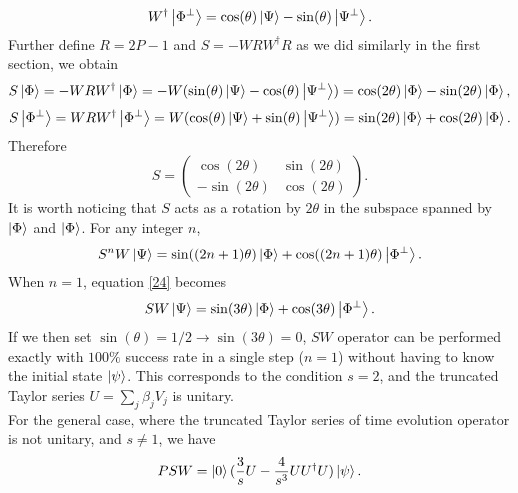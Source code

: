\documentclass{article}
\begin{document}
\begin{equation}
    W^\dagger \ket{\Phi ^\bot} = \cos(\theta)\ket{\Psi} - \sin(\theta) \ket{\Psi ^\bot}.
\end{equation}
Further define $R = 2P - 1$ and $S = -WRW^\dagger R$ as we did similarly in the first section, we obtain
\begin{equation}
    S\ket{\Phi} = -WRW^\dagger \ket{\Phi} = -W(\sin(\theta)\ket{\Psi} - \cos(\theta)\ket{\Psi ^\bot}) = \cos(2 \theta)\ket{\Phi} - \sin(2 \theta)\ket{\Phi},
\end{equation}
\begin{equation}
    S\ket{\Phi ^\bot} = WRW^\dagger \ket{\Phi ^\bot} = W(\cos(\theta)\ket{\Psi} + \sin(\theta)\ket{\Psi ^\bot}) = \sin(2 \theta)\ket{\Phi} + \cos(2 \theta)\ket{\Phi}.
\end{equation}
Therefore
\begin{equation}
    S = 
\begin{pmatrix}

\cos({2\theta})&\sin({2\theta})\\
-\sin({2\theta})&\cos({2\theta})
    
\end{pmatrix}.
\end{equation}
It is worth noticing that $S$ acts as a rotation by $2 \theta$ in the subspace spanned by $\ket{\Phi}$ and $\ket{\Phi}$. For any integer $n$,
\begin{equation}\label{24}
    S^n W\ket{\Psi} = \sin((2n+1)\theta)\ket{\Phi} + \cos((2n+1)\theta)\ket{\Phi ^\bot}.
\end{equation}
When $n=1$, equation \ref{24} becomes
\begin{equation}
    SW\ket{\Psi} = \sin(3 \theta)\ket{\Phi} + \cos(3 \theta)\ket{\Phi ^\bot}.
\end{equation}
If we then set $\sin(\theta) = 1/2 \rightarrow \sin(3 \theta) = 0$, $SW$ operator can be performed exactly with $100\%$ success rate in a single step ($n=1$) without having to know the initial state $\ket{\psi}$. This corresponds to the condition $s=2$, and the truncated Taylor series $U = \sum_j \beta_j V_j$ is unitary. \\
For the general case, where the truncated Taylor series of time evolution operator is not unitary, and $s \neq 1$, we have
\begin{equation}
    PSW = \ket{0}(\frac{3}{s}U -\frac{4}{s^3}UU^\dagger U)\ket{\psi}.
\end{equation}
\end{document}
